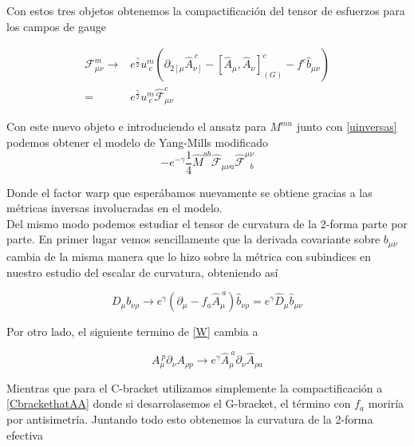 \documentclass{article}
\numberwithin{equation}{section}
\begin{document}
Con estos tres objetos obtenemos la compactificación del tensor de esfuerzos para los campos de gauge

\begin{boxeq}
	\begin{equation}
	\begin{aligned}
	\mathcal{F}^{m}_{\mu \nu} \longrightarrow& e^{\frac{\gamma}{2}} u^{m}_{\ c} \left( \partial_{ 2 \left[\mu\right.} \hat{A}_{\left. \nu\right]}^{\ c} - \left[\hat{A}_{\mu},\hat{A}_{\nu}\right]^c_{(G)} - f^c \hat{b}_{\mu \nu} \right)\\
	=& e^{\frac{\gamma}{2}} u^{m}_{\ c} \hat{\mathcal{F}}^{c}_{\mu \nu}
	\end{aligned}
	\end{equation}
\end{boxeq}

Con este nuevo objeto e introduciendo el ansatz para $ M^{m n} $ junto con \ref{uinversas} podemos obtener el modelo de Yang-Mills modificado\\

\begin{equation}
-e^{- \gamma} \frac{1}{4} \hat{M}^{a b} \hat{\mathcal{F}}_{\mu \nu a} \hat{\mathcal{F}}^{\mu \nu}_{ \ \ \ b}
\end{equation}

Donde el factor warp que esperábamos nuevamente se obtiene gracias a las métricas inversas involucradas en el modelo.\\

Del mismo modo podemos estudiar el tensor de curvatura de la 2-forma parte por parte. En primer lugar vemos sencillamente que la derivada covariante sobre $ b_{\mu \nu} $ cambia de la misma manera que lo hizo sobre la métrica con subindices en nuestro estudio del escalar de curvatura, obteniendo así

\begin{equation}
D_{\mu} b_{\nu \rho} \longrightarrow e^{\gamma} \left( \partial_{\mu} - f_a \hat{A}_{\mu}^{\ a}\right) \hat{b}_{\nu \rho} = e^{\gamma} \hat{D}_{\mu} \hat{b}_{\mu \nu}
\end{equation}

Por otro lado, el siguiente termino de \ref{W} cambia a 

\begin{equation}
A_{\mu}^{\ p} \partial_{\nu} A_{\rho p} \longrightarrow e^{\gamma} \hat{A}_{\mu}^{\ a} \partial_{\nu} \hat{A}_{\rho a}
\end{equation}

Mientras que para el C-bracket utilizamos simplemente la compactificación a \ref{CbrackethatAA} donde si desarrolasemos el G-bracket, el término con $ f_a $ moriría por antisimetría. Juntando todo esto obtenemos la curvatura de la 2-forma efectiva\\
\end{document}
